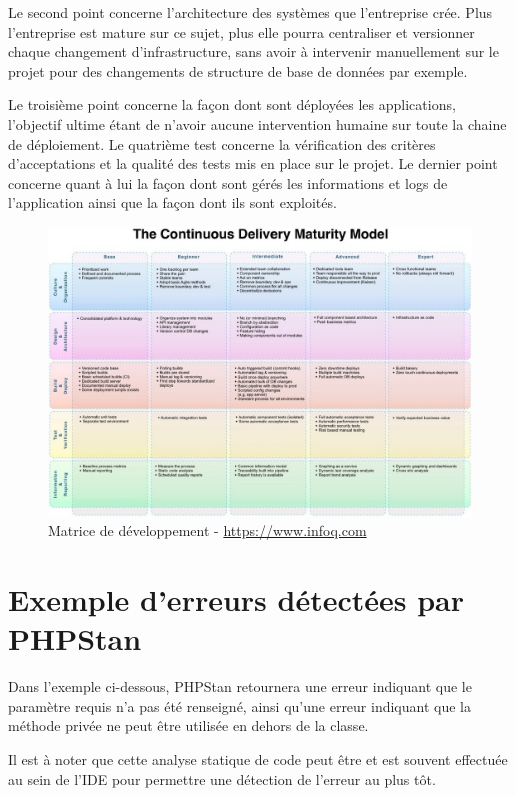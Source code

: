 Le second point concerne l'architecture des systèmes que l'entreprise crée. Plus l'entreprise est mature sur ce sujet, plus elle pourra centraliser et versionner chaque changement d'infrastructure, sans avoir à intervenir manuellement sur le projet pour des changements de structure de base de données par exemple.

Le troisième point concerne la façon dont sont déployées les applications, l'objectif ultime étant de n'avoir aucune intervention humaine sur toute la chaine de déploiement. Le quatrième test concerne la vérification des critères d'acceptations et la qualité des tests mis en place sur le projet. Le dernier point concerne quant à lui la façon dont sont gérés les informations et logs de l'application ainsi que la façon dont ils sont exploités.

\begin{figure}[ht]
	\centering
	\includegraphics[scale=0.62,angle=-90]{img/devops-matrice.jpg}
	\caption{Matrice de développement \devops - \url{https://www.infoq.com}}
	\label{annexe:devops-matrice}
\end{figure}

\clearpage
\section{Exemple d'erreurs détectées par PHPStan}

Dans l'exemple ci-dessous, PHPStan retournera une erreur indiquant que le paramètre requis  n'a pas été renseigné, ainsi qu'une erreur indiquant que la méthode privée  ne peut être utilisée en dehors de la classe. 

Il est à noter que cette analyse statique de code peut être et est souvent effectuée au sein de l'\gls{IDE} pour permettre une détection de l'erreur au plus tôt.


